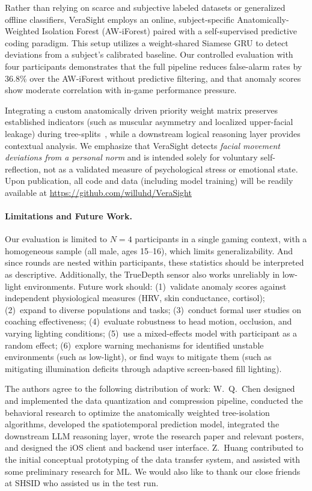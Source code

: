 \documentclass[sigconf]{acmart}
\begin{document}
Rather than relying on scarce and subjective labeled datasets or generalized offline classifiers, VeraSight employs an online, subject-specific Anatomically-Weighted Isolation Forest (AW-iForest) paired with a self-supervised predictive coding paradigm. This setup utilizes a weight-shared Siamese GRU to detect deviations from a subject's calibrated baseline. Our controlled evaluation with four participants demonstrates that the full pipeline reduces false-alarm rates by 36.8\% over the AW-iForest without predictive filtering, and that anomaly scores show moderate correlation with in-game performance pressure.

Integrating a custom anatomically driven priority weight matrix preserves established indicators (such as muscular asymmetry and localized upper-facial leakage) during tree-splits~\cite{porter2012secrets, vitale2021facial}, while a downstream logical reasoning layer provides contextual analysis. We emphasize that VeraSight detects \emph{facial movement deviations from a personal norm} and is intended solely for voluntary self-reflection, not as a validated measure of psychological stress or emotional state. Upon publication, all code and data (including model training) will be readily available at \url{https://github.com/willuhd/VeraSight}

\paragraph{Limitations and Future Work.}
Our evaluation is limited to $N=4$ participants in a single gaming context, with a homogeneous sample (all male, ages 15--16), which limits generalizability. And since rounds are nested within participants, these statistics should be interpreted as descriptive. Additionally, the TrueDepth sensor also works unreliably in low-light environments. Future work should: (1)~validate anomaly scores against independent physiological measures (HRV, skin conductance, cortisol); (2)~expand to diverse populations and tasks; (3)~conduct formal user studies on coaching effectiveness; (4)~evaluate robustness to head motion, occlusion, and varying lighting conditions; (5)~use a mixed-effects model with participant as a random effect; (6)~explore warning mechanisms for identified unstable environments (such as low-light), or find ways to mitigate them (such as mitigating illumination deficits through adaptive screen-based fill lighting).

\begin{acks}
The authors agree to the following distribution of work: 
W.~Q.~Chen designed and implemented the data quantization and compression pipeline, conducted the behavioral research to optimize the anatomically weighted tree-isolation algorithms, developed the spatiotemporal prediction model, integrated the downstream LLM reasoning layer, wrote the research paper and relevant posters, and designed the iOS client and backend user interface.
Z.~Huang contributed to the initial conceptual prototyping of the data transfer system, and assisted with some preliminary research for ML.
We would also like to thank our close friends at SHSID who assisted us in the test run.
\end{acks}



\end{document}
